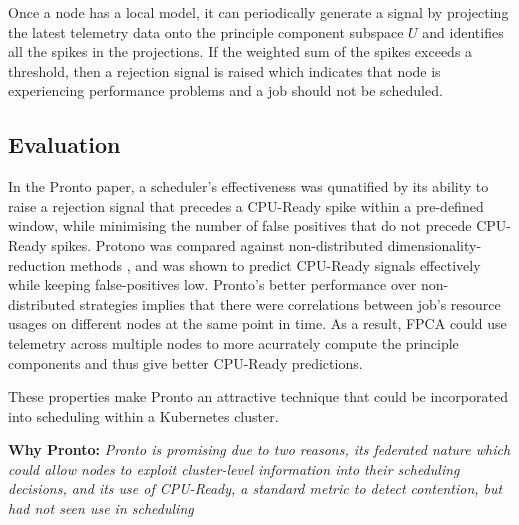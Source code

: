 Once a node has a local model, it can periodically generate a signal by
projecting the latest telemetry data onto the principle component subspace $U$
and identifies all the spikes in the projections. If the weighted sum of the
spikes exceeds a threshold, then a rejection signal is raised which indicates
that node is experiencing performance problems and a job should not be
scheduled.

\subsection{Evaluation}

In the Pronto paper, a scheduler's effectiveness was qunatified by its ability
to raise a rejection signal that precedes a CPU-Ready spike within a pre-defined
window, while minimising the number of false positives that do not precede
CPU-Ready spikes. Protono was compared against non-distributed
dimensionality-reduction methods \cite{}, and was shown to predict CPU-Ready
signals effectively while keeping false-positives low. Pronto's better
performance over non-distributed strategies implies that there were correlations
between job's resource usages on different nodes at the same point in time. As a
result, FPCA could use telemetry across multiple nodes to more acurrately
compute the principle components and thus give better CPU-Ready predictions.

These properties make Pronto an attractive technique that could be incorporated
into scheduling within a Kubernetes cluster.

\begin{tcolorbox}[boxsep=0mm,left=2.5mm,right=2.5mm] \textbf{Why Pronto:}
{\em Pronto is promising due to two reasons, its federated nature which could
allow nodes to exploit cluster-level information into their scheduling
decisions, and its use of CPU-Ready, a standard metric to detect contention, but
had not seen use in scheduling}  \end{tcolorbox}

